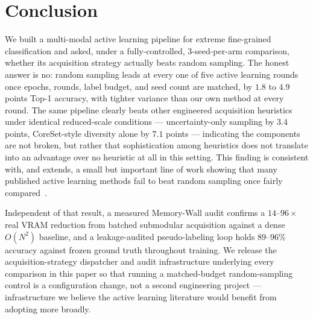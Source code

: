 \documentclass[conference]{IEEEtran}
\begin{document}
\section{Conclusion}
We built a multi-modal active learning pipeline for extreme fine-grained classification and asked, under a fully-controlled, 3-seed-per-arm comparison, whether its acquisition strategy actually beats random sampling. The honest answer is no: random sampling leads at every one of five active learning rounds once epochs, rounds, label budget, and seed count are matched, by $1.8$ to $4.9$ points Top-1 accuracy, with tighter variance than our own method at every round. The same pipeline clearly beats other engineered acquisition heuristics under identical reduced-scale conditions — uncertainty-only sampling by $3.4$ points, CoreSet-style diversity alone by $7.1$ points — indicating the components are not broken, but rather that sophistication among heuristics does not translate into an advantage over no heuristic at all in this setting. This finding is consistent with, and extends, a small but important line of work showing that many published active learning methods fail to beat random sampling once fairly compared~\cite{mittal2019parting,munjal2022towards}.

Independent of that result, a measured Memory-Wall audit confirms a $14$--$96\times$ real VRAM reduction from batched submodular acquisition against a dense $O(N^2)$ baseline, and a leakage-audited pseudo-labeling loop holds $89$--$96\%$ accuracy against frozen ground truth throughout training. We release the acquisition-strategy dispatcher and audit infrastructure underlying every comparison in this paper so that running a matched-budget random-sampling control is a configuration change, not a second engineering project — infrastructure we believe the active learning literature would benefit from adopting more broadly.
\end{document}
